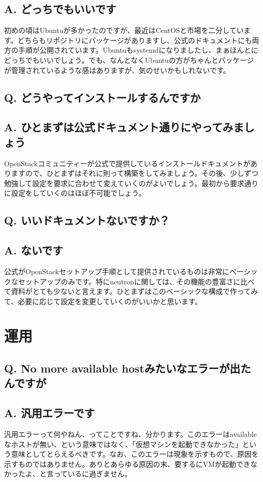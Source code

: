 \documentclass[9pt,b5paper,tombo,openany]{jsbook}
\begin{document}
\subsection*{{\LARGE\bfseries A.} どっちでもいいです}
初めの頃はUbuntuが多かったのですが、最近はCentOSと市場を二分しています。どちらもリポジトリにパッケージがありますし、公式のドキュメントにも両方の手順が公開されています。Ubuntuもsystemdになりましたし、まぁほんとにどっちでもいいでしょう。でも、なんとなくUbuntuの方がちゃんとパッケージが管理されているような感はありますが、気のせいかもしれないです。

\subsection*{{\LARGE\bfseries Q.} どうやってインストールするんですか}
\subsection*{{\LARGE\bfseries A.} ひとまずは公式ドキュメント通りにやってみましょう}
OpenStackコミュニティーが公式で提供しているインストールドキュメントがありますので、ひとまずはそれに則って構築をしてみましょう。その後、少しずつ勉強して設定を要求に合わせて変えていくのがよいでしょう。最初から要求通りに設定をしていくのはほぼ不可能でしょう。

\subsection*{{\LARGE\bfseries Q.} いいドキュメントないですか？}
\subsection*{{\LARGE\bfseries A.} ないです}
公式がOpenStackセットアップ手順として提供されているものは非常にベーシックなセットアップのみです。特にneutronに関しては、その機能の豊富さに比べて資料がとても少ないと言えます。ひとまずはこのベーシックな構成で作ってみて、必要に応じて設定を変更していくのがいいかと思います。

\section{運用}

\subsection*{{\LARGE\bfseries Q.} No more available hostみたいなエラーが出たんですが}
\subsection*{{\LARGE\bfseries A.} 汎用エラーです}
汎用エラーって何やねん、ってことですね、分かります。このエラーはavailableなホストが無い、という意味ではなく、「仮想マシンを起動できなかった」という意味としてとらえるべきです。なお、このエラーは現象を示すもので、原因を示すものではありません。ありとあらゆる原因の末、要するにVMが起動できなかったよ、と言っているに過ぎません。
\end{document}

